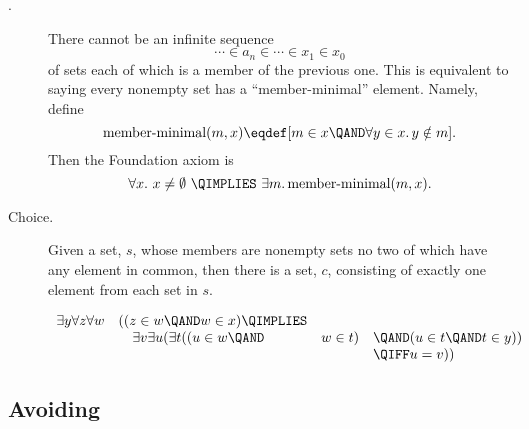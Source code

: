 \begin{description}
\item[.] 
There cannot be an infinite sequence
\[
\cdots \in a_n \in \cdots \in x_1 \in x_0
\]
of sets each of which is a member of the previous one.  This is equivalent
to saying every nonempty set has a ``member-minimal'' element.  Namely, define
\[
\text{member-minimal}(m, x) \eqdef [m \in x \QAND \forall y \in x.\, y \notin m].
\]
Then the Foundation axiom is
\[
\forall x.\ x \neq \emptyset\ \QIMPLIES\ \exists m.\, \text{member-minimal}(m, x).
\]

\iffalse  %
For every non-empty set, $x$, there is a set $y \in x$
  such that $x$ and $y$ have no elements in common.  
\fi

\item[Choice.]  Given a set, $s$, whose members are nonempty sets no two
  of which have any element in common, then there is a set, $c$,
  consisting of exactly one element from each set in $s$.

\iffalse

\begin{tabbing}
$\exists y \, \forall z \, \forall w \,
 \biggl( ($\=$z \in w \,\QAND\, w \in x) \; \QIMPLIES $\\
\> $\exists v \, \exists u \, \Bigl(\exists t \, \bigr((u \in w \, \QAND \, w \in t)$\=$\;\QAND\; (u \in t \,\QAND\, t \in y)\bigl) $\\
\> \> $\QIFF\; u = v\Bigr) \biggr)$
\end{tabbing}
\fi


\[\begin{array}{rlll}
\exists y \forall z \forall w & ( (z \in w \QAND w \in x) \QIMPLIES\\
                              &\quad \exists v \exists u (\exists t
                                           ((u \in w \QAND & w \in t)
                                                              & \QAND (u \in t \QAND t \in y))\\
                                                            &&& \QIFF u = v))
\end{array}\]


\end{description}


\subsection{Avoiding }

